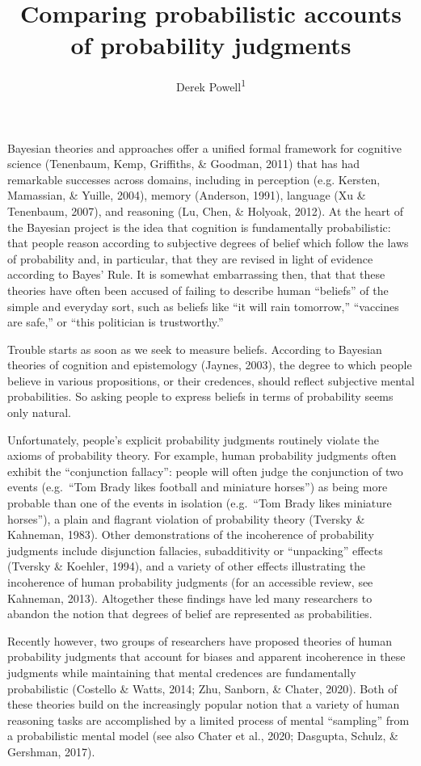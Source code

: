\documentclass[
  english,
  man,floatsintext]{apa6}
\title{Comparing probabilistic accounts of probability judgments}
\author{Derek Powell\textsuperscript{1}}
\date{}
\affiliation{\vspace{0.5cm}\textsuperscript{1} Arizona State University, School of Social and Behavioral Sciences}
\begin{document}
\maketitle

Bayesian theories and approaches offer a unified formal framework for cognitive science (Tenenbaum, Kemp, Griffiths, \& Goodman, 2011) that has had remarkable successes across domains, including in perception (e.g. Kersten, Mamassian, \& Yuille, 2004), memory (Anderson, 1991), language (Xu \& Tenenbaum, 2007), and reasoning (Lu, Chen, \& Holyoak, 2012). At the heart of the Bayesian project is the idea that cognition is fundamentally probabilistic: that people reason according to subjective degrees of belief which follow the laws of probability and, in particular, that they are revised in light of evidence according to Bayes' Rule. It is somewhat embarrassing then, that that these theories have often been accused of failing to describe human ``beliefs'' of the simple and everyday sort, such as beliefs like ``it will rain tomorrow,'' ``vaccines are safe,'' or ``this politician is trustworthy.''

Trouble starts as soon as we seek to measure beliefs. According to Bayesian theories of cognition and epistemology (Jaynes, 2003), the degree to which people believe in various propositions, or their credences, should reflect subjective mental probabilities. So asking people to express beliefs in terms of probability seems only natural.

Unfortunately, people's explicit probability judgments routinely violate the axioms of probability theory. For example, human probability judgments often exhibit the ``conjunction fallacy'': people will often judge the conjunction of two events (e.g.~``Tom Brady likes football and miniature horses'') as being more probable than one of the events in isolation (e.g.~``Tom Brady likes miniature horses''), a plain and flagrant violation of probability theory (Tversky \& Kahneman, 1983). Other demonstrations of the incoherence of probability judgments include disjunction fallacies, subadditivity or ``unpacking'' effects (Tversky \& Koehler, 1994), and a variety of other effects illustrating the incoherence of human probability judgments (for an accessible review, see Kahneman, 2013). Altogether these findings have led many researchers to abandon the notion that degrees of belief are represented as probabilities.

Recently however, two groups of researchers have proposed theories of human probability judgments that account for biases and apparent incoherence in these judgments while maintaining that mental credences are fundamentally probabilistic (Costello \& Watts, 2014; Zhu, Sanborn, \& Chater, 2020). Both of these theories build on the increasingly popular notion that a variety of human reasoning tasks are accomplished by a limited process of mental ``sampling'' from a probabilistic mental model (see also Chater et al., 2020; Dasgupta, Schulz, \& Gershman, 2017).
\end{document}
